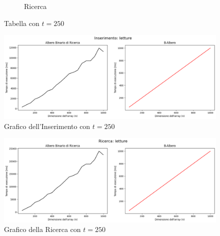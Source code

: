 \begin{figure}[H]
\begin{subfigure}[b]{0.49\textwidth}
        \caption{Ricerca}
        \label{fig:tablesearchtimet250}
    \end{subfigure}
    \caption{Tabella con $t=250$}
    \label{fig:tabletimest250}
\end{figure}

\begin{figure}[H]
    \centering
    \includegraphics[width=\textwidth]{side-graphs/insert-wr-t250.png}
    \caption{Grafico dell'Inserimento con $t=250$}
    \label{fig:sidegraphinserttimet250}
\end{figure}
    
\begin{figure}[H]
    \centering
    \includegraphics[width=\textwidth]{side-graphs/search-wr-t250.png}
    \caption{Grafico della Ricerca con $t=250$}
    \label{fig:sidegraphsearchtimet250}
\end{figure}

